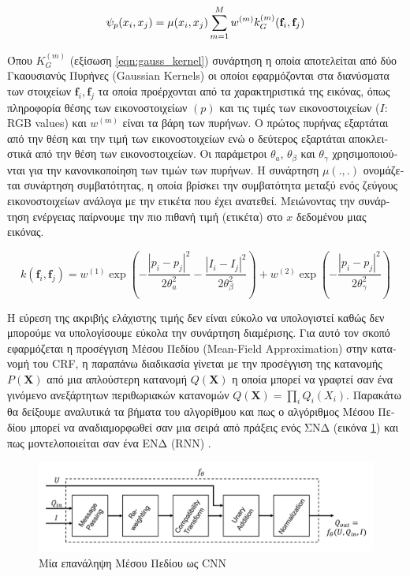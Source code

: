 \begin{equation}
\centering
 \psi_{p}(x_{i},x_{j}) = \mu(x_{i},x_{j}) \displaystyle\sum_{m=1}^{M} w^{(m)}k_{G}^{(m)}(\mathbf{f}_{i},\mathbf{f}_j)
\end{equation}

\textgreek{Όπου $Κ_{G}^{(m)}$ (εξίσωση }\ref{eqn:gauss_kernel}) \textgreek{συνάρτηση η οποία αποτελείται από δύο Γκαουσιανύς Πυρήνες }(Gaussian Kernels) \textgreek{οι οποίοι εφαρμόζονται στα διανύσματα των στοιχείων }$\mathbf{f}_{i},\mathbf{f}_{j}$ \textgreek{τα οποία προέρχονται από τα χαρακτηριστικά της εικόνας, όπως πληροφορία θέσης των εικονοστοιχείων $(p)$ και τις τιμές των εικονοστοιχείων ($I$: }RGB values) \textgreek{και $w^{(m)}$ είναι τα βάρη των πυρήνων. Ο πρώτος πυρήνας εξαρτάται από την θέση και την τιμή των εικονοστοιχείων ενώ ο δεύτερος εξαρτάται αποκλειστικά από την θέση των εικονοστοιχείων. Οι παράμετροι $\theta_a$, $\theta_\beta$ και $\theta_\gamma$ χρησιμοποιούνται για την κανονικοποίηση των τιμών των πυρήνων. Η συνάρτηση $\mu(.,.)$ ονομάζεται συνάρτηση συμβατότητας, η οποία βρίσκει την συμβατότητα μεταξύ ενός ζεύγους εικονοστοιχείων ανάλογα με την ετικέτα που έχει ανατεθεί. Μειώνοντας την συνάρτηση ενέργειας παίρνουμε την πιο πιθανή τιμή (ετικέτα) στο $x$ δεδομένου μιας εικόνας. }

\begin{equation}
\label{eqn:gauss_kernel}
 k(\mathbf{f}_i,\mathbf{f}_j) = w^{(1)}\exp(-\frac{|p_i-p_j|^2}{2\theta^2_a }-\frac{|I_i-I_j|^2}{2\theta_\beta^2})+w^{(2)} \exp(-\frac{|p_i-p_j|^2}{2\theta^2_\gamma })
\end{equation}


\textgreek{Η εύρεση της ακριβής ελάχιστης τιμής δεν είναι εύκολο να υπολογιστεί καθώς δεν μπορούμε να υπολογίσουμε εύκολα την συνάρτηση διαμέρισης. Για αυτό τον σκοπό εφαρμόζεται η προσέγγιση Μέσου Πεδίου} (Mean-Field Approximation) \textgreek{στην κατανομή του }CRF, \textgreek{η παραπάνω διαδικασία γίνεται με την προσέγγιση της κατανομής $P(\mathbf{X})$ από μια απλούστερη κατανομή $Q(\mathbf X)$ η οποία μπορεί να γραφτεί σαν ένα γινόμενο ανεξάρτητων περιθωριακών κατανομών }$Q(\mathbf X) = \prod_{i} Q_{i}(X_{i})$. \textgreek{Παρακάτω θα δείξουμε αναλυτικά τα βήματα του αλγορίθμου και πως ο αλγόριθμος Μέσου Πεδίου μπορεί να αναδιαμορφωθεί σαν μια σειρά από πράξεις ενός ΣΝΔ (εικόνα} \ref{fig:cnn_mean_img})\textgreek{ και πως μοντελοποιείται σαν ένα ENΔ} (RNN) \cite{crf_as_rnn}.

\begin{figure}[H]
 \centering
 \includegraphics[scale=0.4]{Images/cnn_stack}
 \caption[MeanField as CNN]{\textgreek{Μία επανάληψη Μέσου Πεδίου ως }CNN \cite{crf_as_rnn}}
  \label{fig:cnn_mean_img}
\end{figure}

